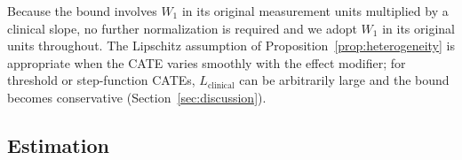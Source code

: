 \documentclass[AMA,Times1COL]{WileyNJDv5}
\begin{document}
Because the bound involves $W_1$ in its original measurement units multiplied by a clinical slope, no further normalization is required and we adopt $W_1$ in its original units throughout. The Lipschitz assumption of Proposition~\ref{prop:heterogeneity} is appropriate when the CATE varies smoothly with the effect modifier; for threshold or step-function CATEs, $L_{\text{clinical}}$ can be arbitrarily large and the bound becomes conservative (Section~\ref{sec:discussion}).

\subsection{Estimation}\label{sec:estimation}
\end{document}
